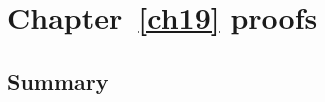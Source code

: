 \chapter{Chapter~\ref{ch19} proofs}

\newpage
\section{Summary}\label{ch19.ps.summary}
\lpscriptsummary
